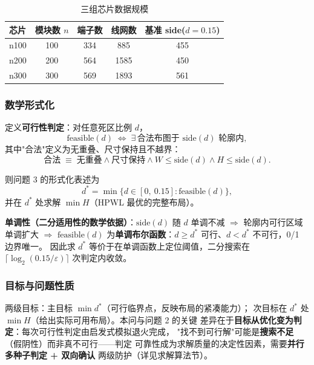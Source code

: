 \documentclass[12pt,a4paper]{article}
\begin{document}
\begin{table}[H]
\centering
\caption{三组芯片数据规模}
\begin{tabular}{lcccc}
\toprule
芯片 & 模块数 $n$ & 端子数 & 线网数 & 基准 side($d{=}0.15$) \\
\midrule
n100 & 100 & 334 & 885 & 455 \\
n200 & 200 & 564 & 1585 & 450 \\
n300 & 300 & 569 & 1893 & 561 \\
\bottomrule
\end{tabular}
\end{table}

\subsubsection*{数学形式化}

定义\textbf{可行性判定}：对任意死区比例 $d$，
\begin{equation}
\text{feasible}(d) \;\Longleftrightarrow\;
\exists\, \text{合法布图于 } \text{side}(d) \text{ 轮廓内},
\end{equation}
其中"合法"定义为无重叠、尺寸保持且不越界：
\begin{equation}
\text{合法} \;\equiv\; \text{无重叠} \wedge \text{尺寸保持}
\wedge W \le \text{side}(d) \wedge H \le \text{side}(d).
\end{equation}

则问题 3 的形式化表述为
\begin{equation}
d^* = \min \big\{ d \in [0,\ 0.15] : \text{feasible}(d) \big\},
\end{equation}
并在 $d^*$ 处求解 $\min H$（HPWL 最优的完整布局）。

\textbf{单调性（二分适用性的数学依据）}：$\text{side}(d)$ 随 $d$ 单调不减
$\Rightarrow$ 轮廓内可行区域单调扩大 $\Rightarrow$ $\text{feasible}(d)$
为\textbf{单调布尔函数}：$d \ge d^*$ 可行、$d < d^*$ 不可行，0/1 边界唯一。
因此求 $d^*$ 等价于在单调函数上定位阈值，二分搜索在 $\lceil \log_2
(0.15/\varepsilon) \rceil$ 次判定内收敛。

\subsubsection*{目标与问题性质}

两级目标：主目标 $\min d^*$（可行临界点，反映布局的紧凑能力）；
次目标在 $d^*$ 处 $\min H$（给出实际可用布局）。本问与问题 2 的关键
差异在于\textbf{目标从优化变为判定}：每次可行性判定由启发式模拟退火完成，
"找不到可行解"可能是\textbf{搜索不足}（假阴性）而非真不可行——判定
可靠性成为求解质量的决定性因素，需要\textbf{并行多种子判定 + 双向确认}
两级防护（详见求解算法节）。
\end{document}
